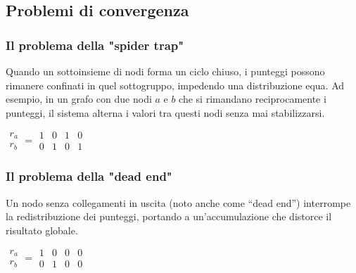 \documentclass{report}
\begin{document}
	\subsection{Problemi di convergenza}
	\subsubsection{Il problema della "spider trap"}
	Quando un sottoinsieme di nodi forma un ciclo chiuso, i punteggi possono rimanere confinati in quel sottogruppo, impedendo una distribuzione equa. Ad esempio, in un grafo con due nodi \(a\) e \(b\) che si rimandano reciprocamente i punteggi, il sistema alterna i valori tra questi nodi senza mai stabilizzarsi.
	\begin{center}
		\quad
		\(
		\begin{matrix}
			r_a \\
			r_b
		\end{matrix}
		=
		\begin{matrix}
			1 & 0 & 1 & 0\\
			0 & 1 & 0 & 1
		\end{matrix}
		\)
	\end{center}

	\subsubsection{Il problema della "dead end"}
	Un nodo senza collegamenti in uscita (noto anche come ``dead end'') interrompe la redistribuzione dei punteggi, portando a un'accumulazione che distorce il risultato globale.
	\begin{center}
		\quad
		\(
		\begin{matrix}
			r_a \\
			r_b
		\end{matrix}
		=
		\begin{matrix}
			1 & 0 & 0 & 0\\
			0 & 1 & 0 & 0
		\end{matrix}
		\)
	\end{center}
\end{document}
